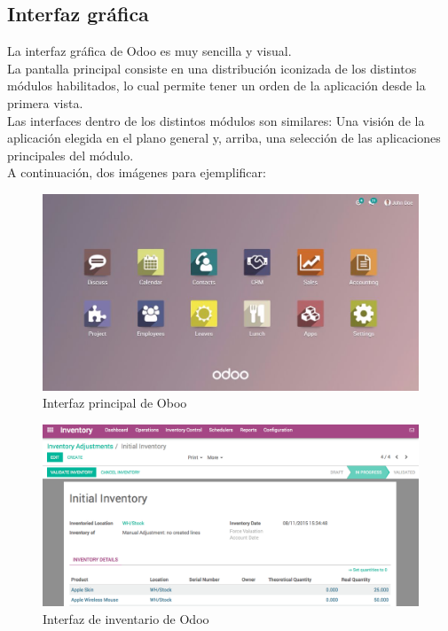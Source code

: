\documentclass[openany,overnay,a4paper, twoside, 12pt]{book}
\begin{document}
\subsection{Interfaz gráfica}
La interfaz gráfica de Odoo es muy sencilla y visual. \\La pantalla principal consiste en una distribución iconizada de los distintos módulos habilitados, lo cual permite tener un orden de la aplicación desde la primera vista.\\
Las interfaces dentro de los distintos módulos son similares: Una visión de la aplicación elegida en el plano general y, arriba, una selección de las aplicaciones principales del módulo.\\ A continuación, dos imágenes para ejemplificar: 
\begin{figure}[b]
    \centering
    \includegraphics[scale=0.3]{sgeI/interfazPrincipal.jpg}
    \caption{Interfaz principal de Oboo}
    \label{fig:my_label}
\end{figure}
\begin{figure}[H]
    \centering
    \includegraphics[scale=0.3]{sgeI/interfazInventario.jpg}
    \caption{Interfaz de inventario de Odoo}
    \label{fig:my_label}
\end{figure}
\newpage
\end{document}
